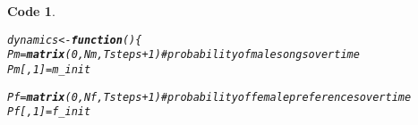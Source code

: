 \documentclass{article}\usepackage[]{graphicx}\usepackage[]{color}
\makeatletter
\newcommand{\hlnum}[1]{\textcolor[rgb]{0.686,0.059,0.569}{#1}}%
\newcommand{\hlcom}[1]{\textcolor[rgb]{0.678,0.584,0.686}{\textit{#1}}}%
\newcommand{\hlopt}[1]{\textcolor[rgb]{0,0,0}{#1}}%
\newcommand{\hlstd}[1]{\textcolor[rgb]{0.345,0.345,0.345}{#1}}%
\newcommand{\hlkwa}[1]{\textcolor[rgb]{0.161,0.373,0.58}{\textbf{#1}}}%
\newcommand{\hlkwb}[1]{\textcolor[rgb]{0.69,0.353,0.396}{#1}}%
\newcommand{\hlkwd}[1]{\textcolor[rgb]{0.737,0.353,0.396}{\textbf{#1}}}%
\newenvironment{kframe}{%
 \def\at@end@of@kframe{}%
 \ifinner\ifhmode%
  \def\at@end@of@kframe{\end{minipage}}%
  \begin{minipage}{\columnwidth}%
 \fi\fi%
 \def\FrameCommand##1{\hskip\@totalleftmargin \hskip-\fboxsep
 \colorbox{shadecolor}{##1}\hskip-\fboxsep
     \hskip-\linewidth \hskip-\@totalleftmargin \hskip\columnwidth}%
 \MakeFramed {\advance\hsize-\width
   \@totalleftmargin\z@ \linewidth\hsize
   \@setminipage}}%
 {\par\unskip\endMakeFramed%
 \at@end@of@kframe}
\newenvironment{knitrout}{}{} %
\newtheorem{rexample}{Code}[section]
\makeatother
\begin{document}
\begin{knitrout}\footnotesize
{}\color{fgcolor}\begin{kframe}
\begin{rexample}\label{dynamics}\hfill{}\begin{alltt}
\hlstd{dynamics} \hlkwb{<-}\hlkwa{function}\hlstd{()\{}
\hlstd{Pm} \hlkwb{=} \hlkwd{matrix}\hlstd{(}\hlnum{0}\hlstd{,Nm,Tsteps}\hlopt{+}\hlnum{1}\hlstd{)} \hlcom{#probability of male songs over time}
\hlstd{Pm[,}\hlnum{1}\hlstd{]} \hlkwb{=} \hlstd{m_init}

\hlstd{Pf} \hlkwb{=} \hlkwd{matrix}\hlstd{(}\hlnum{0}\hlstd{,Nf,Tsteps}\hlopt{+}\hlnum{1}\hlstd{)} \hlcom{#probability of female preferences over time}
\hlstd{Pf[,}\hlnum{1}\hlstd{]} \hlkwb{=} \hlstd{f_init}


\end{alltt}
\end{rexample}
\end{kframe}
\end{knitrout}
\end{document}

